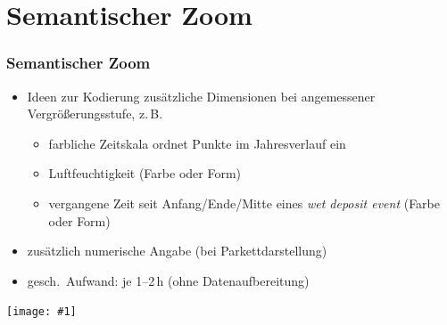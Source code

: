 \documentclass{beamer}
\newcommand{\wholeslidegraphics}[1]{
	\begin{center}
		\texttt{[image: \#1]}
	\end{center}
}
\begin{document}
    \section{Semantischer Zoom}
    \begin{frame}
			\frametitle{Semantischer Zoom}
			\begin{itemize}
				\setlength\itemsep{1em}
				\item Ideen zur Kodierung zusätzliche Dimensionen bei angemessener Vergrößerungsstufe, z.\,B.
					\begin{itemize}
						\item farbliche Zeitskala ordnet Punkte im Jahresverlauf ein
						\item Luftfeuchtigkeit (Farbe oder Form)
						\item vergangene Zeit seit Anfang/Ende/Mitte eines \emph{wet deposit event} (Farbe oder Form)
					\end{itemize}
				\item zusätzlich numerische Angabe (bei Parkettdarstellung)
				\item gesch.\ Aufwand: je 1--2\,h (ohne Datenaufbereitung)
			\end{itemize}
    \end{frame}
    \begin{frame}
    	\wholeslidegraphics{scatter-plot-semantic-zoom}
    \end{frame}
\end{document}
